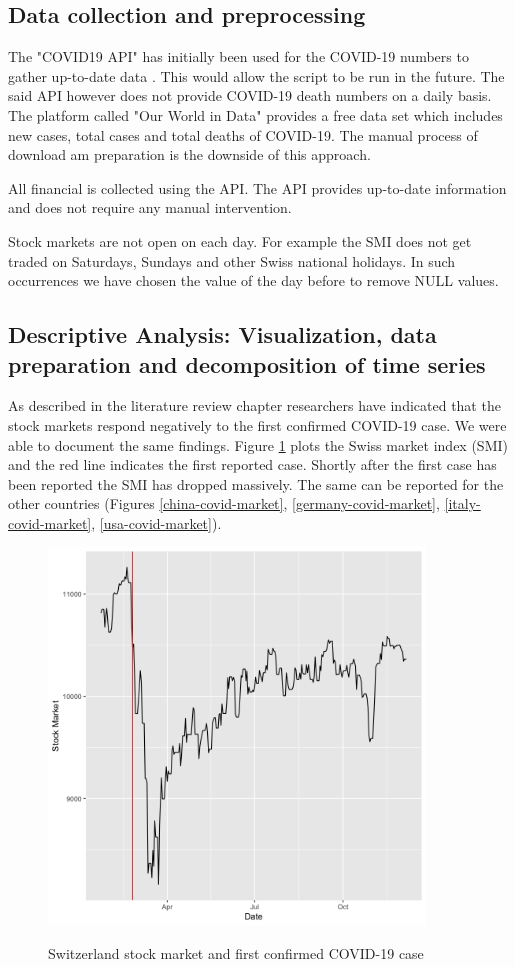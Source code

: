 \documentclass[11pt]{article}
\begin{document}
\subsection{Data collection and preprocessing}
The "COVID19 API" has initially been used for the COVID-19 numbers to gather up-to-date data \cite{covid-api}. This would allow the script to be run in the future. The said API however does not provide COVID-19 death numbers on a daily basis. The platform called "Our World in Data" provides a free data set which includes new cases, total cases and total deaths of COVID-19. The manual process of download am preparation is the downside of this approach.

All financial is collected using the \cite{yahoo-finance} API. The API provides up-to-date information and does not require any manual intervention.

Stock markets are not open on each day. For example the SMI does not get traded on Saturdays, Sundays and other Swiss national holidays. In such occurrences we have chosen the value of the day before to remove NULL values. 


\subsection{Descriptive Analysis: Visualization, data preparation and decomposition of time series}
As described in the literature review chapter researchers have indicated that the stock markets respond negatively to the first confirmed COVID-19 case. We were able to document the same findings. Figure \ref{switzerland-covid-market} plots the Swiss market index (SMI) and the red line indicates the first reported case. Shortly after the first case has been reported the SMI has dropped massively. The same can be reported for the other countries (Figures \ref{china-covid-market}, \ref{germany-covid-market}, \ref{italy-covid-market}, \ref{usa-covid-market}).

\begin{figure}[!h]
\centering
\includegraphics[width=100mm]{R-Code/plots/switzerlandFinance.png} \\
\caption{Switzerland stock market and first confirmed COVID-19 case}
\label{switzerland-covid-market}
\end{figure}
\end{document}
